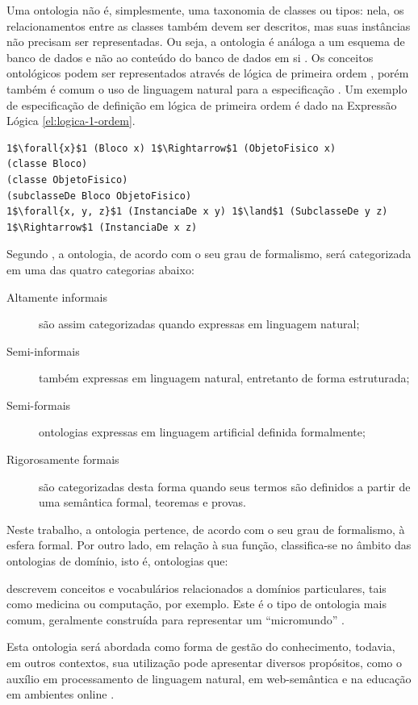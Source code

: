 Uma ontologia não é, simplesmente, uma taxonomia de classes ou tipos: nela, os relacionamentos entre as classes também devem ser descritos, mas suas instâncias não precisam ser representadas.  Ou seja, a ontologia é análoga a um esquema de banco de dados e não ao conteúdo do banco de dados em si \cite{WEISS1999}. Os conceitos ontológicos podem ser representados através de lógica de primeira ordem \cite{WEISS1999}, porém também é comum o uso de linguagem natural para a especificação \cite{UFG2007}. Um exemplo de especificação de definição em lógica de primeira ordem é dado na Expressão Lógica \ref{el:logica-1-ordem}.


\vspace{0.4cm}
\begin{lstlisting}[label={el:logica-1-ordem},frame=single]
1$\forall{x}$1 (Bloco x) 1$\Rightarrow$1 (ObjetoFisico x)
(classe Bloco)
(classe ObjetoFisico)
(subclasseDe Bloco ObjetoFisico)
1$\forall{x, y, z}$1 (InstanciaDe x y) 1$\land$1 (SubclasseDe y z) 1$\Rightarrow$1 (InstanciaDe x z)
\end{lstlisting}


Segundo \cite{UFG2007},  a ontologia,  de acordo com o seu grau de formalismo, será categorizada em uma das quatro categorias abaixo:
\begin{description}
    \item [Altamente informais] são assim categorizadas quando expressas em linguagem natural;
    \item [Semi-informais] também expressas em linguagem natural, entretanto de forma estruturada;
    \item [Semi-formais] ontologias expressas em linguagem artificial definida formalmente;
    \item [Rigorosamente formais] são categorizadas desta forma quando seus termos são definidos a partir de uma semântica formal, teoremas e provas.
\end{description}

Neste trabalho, a ontologia pertence, de acordo com o seu grau de formalismo, à esfera formal. Por outro lado, em relação à sua função, classifica-se no âmbito das ontologias de domínio, isto é, ontologias que: 
\begin{directcite}
    descrevem conceitos e vocabulários relacionados a domínios particulares, tais como medicina ou computação, por exemplo.  Este é o tipo de ontologia mais comum, geralmente construída para representar um “micromundo” \cite{UFG2007}.
\end{directcite}Esta ontologia será abordada como forma de gestão do conhecimento, todavia, em outros contextos,  sua utilização pode apresentar diversos propósitos,  como o auxílio em processamento de linguagem natural, em web-semântica e na educação em ambientes online \cite{UFG2007}.


